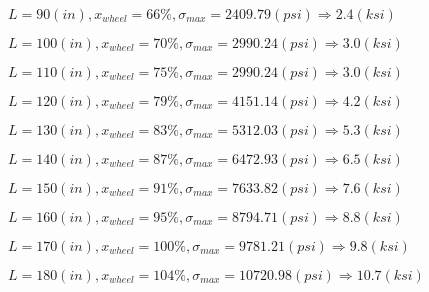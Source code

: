 \documentclass[11pt]{article}
\newcommand{\prompt}[4]{
        {\ttfamily\llap{{\color{#2}[#3]:\hspace{3pt}#4}}\vspace{-\baselineskip}}
    }
\begin{document}
            
\prompt{Out}{outcolor}{12}{}
    
    $L= 90(in), x_{wheel}=66 \%, \sigma_{max}=2409.79(psi) \Rightarrow 2.4(ksi)$

    
 
            
\prompt{Out}{outcolor}{12}{}
    
    $L= 100(in), x_{wheel}=70 \%, \sigma_{max}=2990.24(psi) \Rightarrow 3.0(ksi)$

    
 
            
\prompt{Out}{outcolor}{12}{}
    
    $L= 110(in), x_{wheel}=75 \%, \sigma_{max}=2990.24(psi) \Rightarrow 3.0(ksi)$

    
 
            
\prompt{Out}{outcolor}{12}{}
    
    $L= 120(in), x_{wheel}=79 \%, \sigma_{max}=4151.14(psi) \Rightarrow 4.2(ksi)$

    
 
            
\prompt{Out}{outcolor}{12}{}
    
    $L= 130(in), x_{wheel}=83 \%, \sigma_{max}=5312.03(psi) \Rightarrow 5.3(ksi)$

    
 
            
\prompt{Out}{outcolor}{12}{}
    
    $L= 140(in), x_{wheel}=87 \%, \sigma_{max}=6472.93(psi) \Rightarrow 6.5(ksi)$

    
 
            
\prompt{Out}{outcolor}{12}{}
    
    $L= 150(in), x_{wheel}=91 \%, \sigma_{max}=7633.82(psi) \Rightarrow 7.6(ksi)$

    
 
            
\prompt{Out}{outcolor}{12}{}
    
    $L= 160(in), x_{wheel}=95 \%, \sigma_{max}=8794.71(psi) \Rightarrow 8.8(ksi)$

    
 
            
\prompt{Out}{outcolor}{12}{}
    
    $L= 170(in), x_{wheel}=100 \%, \sigma_{max}=9781.21(psi) \Rightarrow 9.8(ksi)$

    
 
            
\prompt{Out}{outcolor}{12}{}
    
    $L= 180(in), x_{wheel}=104 \%, \sigma_{max}=10720.98(psi) \Rightarrow 10.7(ksi)$

    
 
            
\prompt{Out}{outcolor}{12}{}
    
\end{document}
